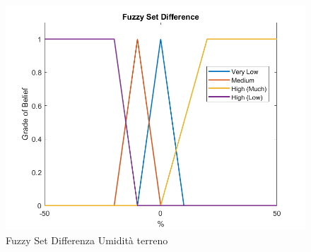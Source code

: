 \documentclass[conference,10pt]{IEEEtran}
\begin{document}
\begin{figure}[ht]
	\centering
	\includegraphics[width=1\linewidth]{images/diff_fs.png}
	\caption{Fuzzy Set Differenza Umidità terreno}
	\label{fig:MAD}
\end{figure}
\end{document}
